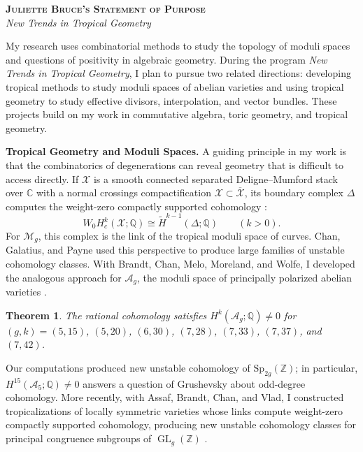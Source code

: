 \documentclass[11pt,reqno]{amsart}
\newcommand{\cA}{\mathcal{A}}
\newcommand{\cM}{\mathcal{M}}
\newcommand{\cX}{\mathcal{X}}
\newcommand{\Q}{\mathbb{Q}}
\newcommand{\C}{\mathbb{C}}
\newcommand{\Z}{\mathbb{Z}}
\DeclareMathOperator{\GL}{GL}
\newtheorem{theorem}{Theorem}
\begin{document}
\begin{center}
{\large\bfseries\scshape Juliette Bruce's Statement of Purpose}\\[3pt]
{\itshape New Trends in Tropical Geometry}
\end{center}
\vspace{-5pt}

My research uses combinatorial methods to study the topology of moduli spaces and questions of positivity in algebraic geometry. During the program \emph{New Trends in Tropical Geometry}, I plan to pursue two related directions: developing tropical methods to study moduli spaces of abelian varieties and using tropical geometry to study effective divisors, interpolation, and vector bundles. These projects build on my work in commutative algebra, toric geometry, and tropical geometry.

\textbf{Tropical Geometry and Moduli Spaces.}
A guiding principle in my work is that the combinatorics of degenerations can reveal geometry that is difficult to access directly. If $\cX$ is a smooth connected separated Deligne--Mumford stack over $\C$ with a normal crossings compactification $\cX\subset\overline{\cX}$, its boundary complex $\Delta$ computes the weight-zero compactly supported cohomology \cite[\S5]{CGP21}:
\[
W_0H_c^k(\cX;\Q)\cong\widetilde H^{k-1}(\Delta;\Q)\qquad(k>0).
\]
For $\cM_g$, this complex is the link of the tropical moduli space of curves. Chan, Galatius, and Payne used this perspective to produce large families of unstable cohomology classes. With Brandt, Chan, Melo, Moreland, and Wolfe, I developed the analogous approach for $\cA_g$, the moduli space of principally polarized abelian varieties \cite{BBCMMW24}. 

\begin{theorem}\cite[Thm.~A]{BBCMMW24}\label{thm:Ag}
The rational cohomology satisfies $H^{k}(\cA_{g};\Q)\neq0$ for $(g,k)=(5,15)$, $(5,20)$, $(6,30)$, $(7,28)$, $(7,33)$, $(7,37)$, and $(7,42)$.
\end{theorem}

Our computations produced new unstable cohomology of $\mathrm{Sp}_{2g}(\Z)$; in particular, $H^{15}(\cA_5;\Q)\neq0$ answers a question of Grushevsky about odd-degree cohomology. More recently, with Assaf, Brandt, Chan, and Vlad, I constructed tropicalizations of locally symmetric varieties whose links compute weight-zero compactly supported cohomology, producing new unstable cohomology classes for principal congruence subgroups of $\GL_g(\Z)$ \cite{ABBCV25}.
\end{document}
